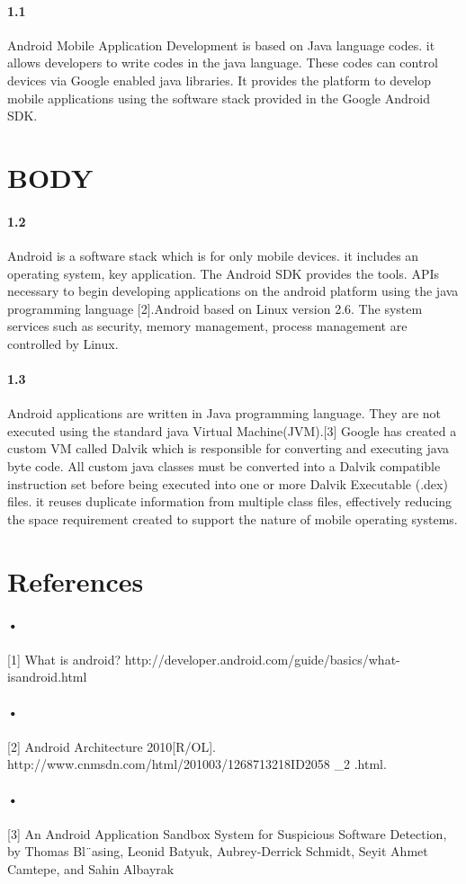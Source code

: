 \documentclass[10pt,a4paper]{article}
\begin{document}
\paragraph{1.1} 
Android Mobile Application Development is based on Java language codes. it allows developers to write codes in the java language. These codes can control devices via Google enabled java libraries. It provides the platform to develop mobile applications using the software stack provided in the Google Android SDK.
\section{BODY}
\paragraph{1.2}
Android is a software stack which is for only mobile devices. it includes an operating system, key application. The Android SDK provides the tools. APIs necessary to begin developing applications on the android platform using the java programming language [2].Android based on Linux version 2.6. The system services such as security, memory management, process management are controlled by Linux.
\paragraph{1.3}
Android applications are written in Java programming language. They are not executed using the standard java Virtual Machine(JVM).[3] Google has created a custom VM called Dalvik which is responsible for converting and executing java byte code. All custom java classes must be converted into a Dalvik compatible instruction set before being executed into one or more Dalvik Executable (.dex) files. it reuses duplicate information from multiple class files, effectively reducing the space requirement created to support the nature of mobile operating systems.
\section{References}
\paragraph{•}
[1] What is android? http://developer.android.com/guide/basics/what-isandroid.html
\paragraph{•}
[2]  Android Architecture 2010[R/OL]. http://www.cnmsdn.com/html/201003/1268713218ID2058 _2 .html. 
\paragraph{•}
[3]  An Android Application Sandbox System for Suspicious Software Detection, by Thomas Bl¨asing, Leonid Batyuk, Aubrey-Derrick Schmidt, Seyit Ahmet Camtepe, and Sahin Albayrak
\end{document}
